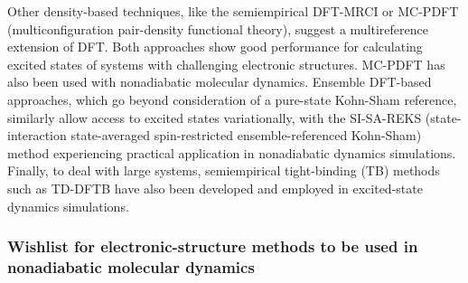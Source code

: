 \documentclass[9pt,bestpractices,pubversion]{livecoms}
\newcommand\bfec[1]{\textcolor{blue}{\textit{ XXX BFEC: #1 XXX }}}
\begin{document}
Other density-based techniques, like the semiempirical DFT-MRCI\cite{grimme1999combination} or MC-PDFT (multiconfiguration pair-density functional theory),\cite{gagliardi2017multiconfiguration} suggest a multireference extension of DFT. Both approaches show good performance for calculating excited states of systems with challenging electronic structures. MC-PDFT has also been used with nonadiabatic molecular dynamics.\cite{calio2022nonadiabatic} 
Ensemble DFT-based approaches, which go beyond consideration of a pure-state Kohn-Sham reference,\cite{lieb_density_1983,gross_density-functional_1988} similarly allow access to excited states variationally, with the SI-SA-REKS (state-interaction state-averaged spin-restricted ensemble-referenced Kohn-Sham) method\cite{filatov1999spin,filatov_spin-restricted_2015} experiencing practical application in nonadiabatic dynamics simulations.\cite{filatov2019theoretical,filatov2019non,janos2023controls}
Finally, to deal with large systems, semiempirical tight-binding (TB) methods such as TD-DFTB have also been developed\cite{niehaus2001tight} and employed in excited-state dynamics simulations.\cite{mitric2009nonadiabatic,humeniuk2017dftbaby}



\subsubsection{Wishlist for electronic-structure methods to be used in nonadiabatic molecular dynamics}
\end{document}
